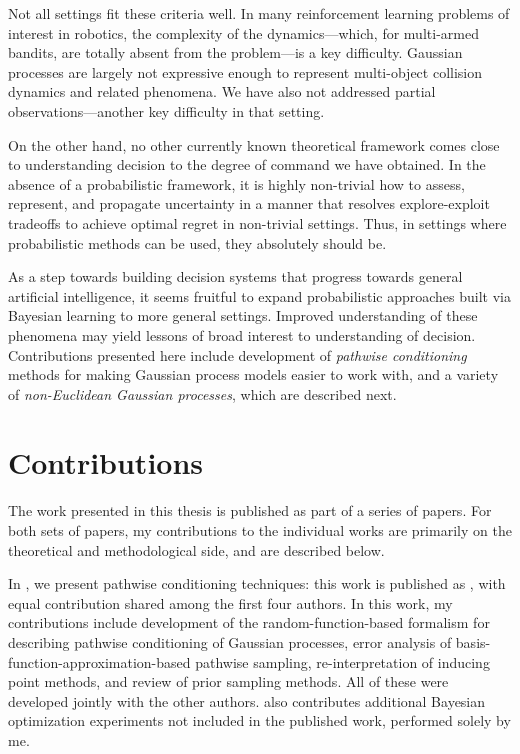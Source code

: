 \documentclass[11pt]{book}
\begin{document}
Not all settings fit these criteria well.
In many reinforcement learning problems of interest in robotics, the complexity of the dynamics---which, for multi-armed bandits, are totally absent from the problem---is a key difficulty.
Gaussian processes are largely not expressive enough to represent multi-object collision dynamics and related phenomena.
We have also not addressed partial observations---another key difficulty in that setting.

On the other hand, no other currently known theoretical framework comes close to understanding decision to the degree of command we have obtained.
In the absence of a probabilistic framework, it is highly non-trivial how to assess, represent, and propagate uncertainty in a manner that resolves explore-exploit tradeoffs to achieve optimal regret in non-trivial settings.
Thus, in settings where probabilistic methods can be used, they absolutely should be.

As a step towards building decision systems that progress towards general artificial intelligence, it seems fruitful to expand probabilistic approaches built via Bayesian learning to more general settings.
Improved understanding of these phenomena may yield lessons of broad interest to understanding of decision.
Contributions presented here include development of \emph{pathwise conditioning} methods for making Gaussian process models easier to work with, and a variety of \emph{non-Euclidean Gaussian processes}, which are described next.

\section{Contributions}

The work presented in this thesis is published as part of a series of papers.
For both sets of papers, my contributions to the individual works are primarily on the theoretical and methodological side, and are described below.

In , we present pathwise conditioning techniques: this work is published as \textcite{wilson20,wilson21}, with equal contribution shared among the first four authors.
In this work, my contributions include development of the random-function-based formalism for describing pathwise conditioning of Gaussian processes, error analysis of basis-function-approximation-based pathwise sampling, re-interpretation of inducing point methods, and review of prior sampling methods.
All of these were developed jointly with the other authors. 
 also contributes additional Bayesian optimization experiments not included in the published work, performed solely by me.
\end{document}
